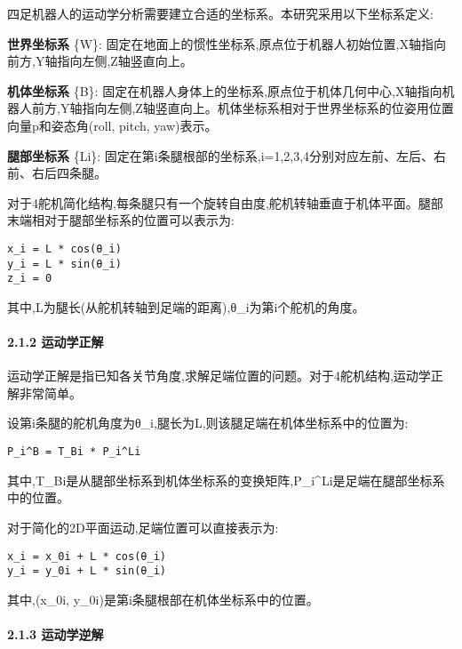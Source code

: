 \documentclass[
]{article}
\begin{document}
四足机器人的运动学分析需要建立合适的坐标系。本研究采用以下坐标系定义:

\textbf{世界坐标系} \{W\}:
固定在地面上的惯性坐标系,原点位于机器人初始位置,X轴指向前方,Y轴指向左侧,Z轴竖直向上。

\textbf{机体坐标系} \{B\}:
固定在机器人身体上的坐标系,原点位于机体几何中心,X轴指向机器人前方,Y轴指向左侧,Z轴竖直向上。机体坐标系相对于世界坐标系的位姿用位置向量p和姿态角(roll,
pitch, yaw)表示。

\textbf{腿部坐标系} \{Li\}:
固定在第i条腿根部的坐标系,i=1,2,3,4分别对应左前、左后、右前、右后四条腿。

对于4舵机简化结构,每条腿只有一个旋转自由度,舵机转轴垂直于机体平面。腿部末端相对于腿部坐标系的位置可以表示为:

\begin{verbatim}
x_i = L * cos(θ_i)
y_i = L * sin(θ_i)
z_i = 0
\end{verbatim}

其中,L为腿长(从舵机转轴到足端的距离),θ\_i为第i个舵机的角度。

\hypertarget{ux8fd0ux52a8ux5b66ux6b63ux89e3}{%
\paragraph{2.1.2 运动学正解}\label{ux8fd0ux52a8ux5b66ux6b63ux89e3}}

运动学正解是指已知各关节角度,求解足端位置的问题。对于4舵机结构,运动学正解非常简单。

设第i条腿的舵机角度为θ\_i,腿长为L,则该腿足端在机体坐标系中的位置为:

\begin{verbatim}
P_i^B = T_Bi * P_i^Li
\end{verbatim}

其中,T\_Bi是从腿部坐标系到机体坐标系的变换矩阵,P\_i\^{}Li是足端在腿部坐标系中的位置。

对于简化的2D平面运动,足端位置可以直接表示为:

\begin{verbatim}
x_i = x_0i + L * cos(θ_i)
y_i = y_0i + L * sin(θ_i)
\end{verbatim}

其中,(x\_0i, y\_0i)是第i条腿根部在机体坐标系中的位置。

\hypertarget{ux8fd0ux52a8ux5b66ux9006ux89e3}{%
\paragraph{2.1.3 运动学逆解}\label{ux8fd0ux52a8ux5b66ux9006ux89e3}}
\end{document}
